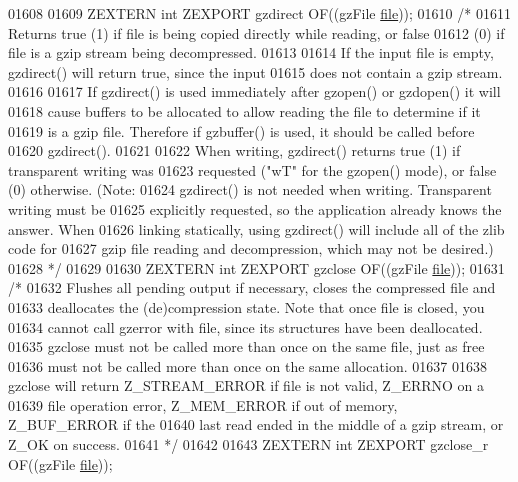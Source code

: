 \begin{DoxyCode}
01608 
01609 ZEXTERN \textcolor{keywordtype}{int} ZEXPORT gzdirect OF((gzFile \hyperlink{structfile}{file}));
01610 \textcolor{comment}{/*}
01611 \textcolor{comment}{     Returns true (1) if file is being copied directly while reading, or false}
01612 \textcolor{comment}{   (0) if file is a gzip stream being decompressed.}
01613 \textcolor{comment}{}
01614 \textcolor{comment}{     If the input file is empty, gzdirect() will return true, since the input}
01615 \textcolor{comment}{   does not contain a gzip stream.}
01616 \textcolor{comment}{}
01617 \textcolor{comment}{     If gzdirect() is used immediately after gzopen() or gzdopen() it will}
01618 \textcolor{comment}{   cause buffers to be allocated to allow reading the file to determine if it}
01619 \textcolor{comment}{   is a gzip file.  Therefore if gzbuffer() is used, it should be called before}
01620 \textcolor{comment}{   gzdirect().}
01621 \textcolor{comment}{}
01622 \textcolor{comment}{     When writing, gzdirect() returns true (1) if transparent writing was}
01623 \textcolor{comment}{   requested ("wT" for the gzopen() mode), or false (0) otherwise.  (Note:}
01624 \textcolor{comment}{   gzdirect() is not needed when writing.  Transparent writing must be}
01625 \textcolor{comment}{   explicitly requested, so the application already knows the answer.  When}
01626 \textcolor{comment}{   linking statically, using gzdirect() will include all of the zlib code for}
01627 \textcolor{comment}{   gzip file reading and decompression, which may not be desired.)}
01628 \textcolor{comment}{*/}
01629 
01630 ZEXTERN \textcolor{keywordtype}{int} ZEXPORT    gzclose OF((gzFile \hyperlink{structfile}{file}));
01631 \textcolor{comment}{/*}
01632 \textcolor{comment}{     Flushes all pending output if necessary, closes the compressed file and}
01633 \textcolor{comment}{   deallocates the (de)compression state.  Note that once file is closed, you}
01634 \textcolor{comment}{   cannot call gzerror with file, since its structures have been deallocated.}
01635 \textcolor{comment}{   gzclose must not be called more than once on the same file, just as free}
01636 \textcolor{comment}{   must not be called more than once on the same allocation.}
01637 \textcolor{comment}{}
01638 \textcolor{comment}{     gzclose will return Z\_STREAM\_ERROR if file is not valid, Z\_ERRNO on a}
01639 \textcolor{comment}{   file operation error, Z\_MEM\_ERROR if out of memory, Z\_BUF\_ERROR if the}
01640 \textcolor{comment}{   last read ended in the middle of a gzip stream, or Z\_OK on success.}
01641 \textcolor{comment}{*/}
01642 
01643 ZEXTERN \textcolor{keywordtype}{int} ZEXPORT gzclose\_r OF((gzFile \hyperlink{structfile}{file}));

\end{DoxyCode}
